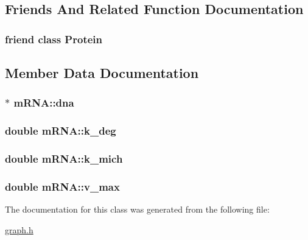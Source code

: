 \subsection{Friends And Related Function Documentation}
\hypertarget{classm_r_n_a_a2cc8b86817f46f61585ecf591984f8eb}{
\subsubsection[{Protein}]{\setlength{\rightskip}{0pt plus 5cm}friend class {\bf Protein}\hspace{0.3cm}{\ttfamily [friend]}}}\label{classm_r_n_a_a2cc8b86817f46f61585ecf591984f8eb}


\subsection{Member Data Documentation}
\hypertarget{classm_r_n_a_ace67bd5431ec023732e05049e5ca9a4b}{
\subsubsection[{dna}]{$\ast$ m\-R\-N\-A\-::dna\hspace{0.3cm}{\ttfamily [private]}}}\label{classm_r_n_a_ace67bd5431ec023732e05049e5ca9a4b}
\hypertarget{classm_r_n_a_ac4e84c4700ca924196809e36fa17c5b7}{
\subsubsection[{k\-\_\-deg}]{\setlength{\rightskip}{0pt plus 5cm}double m\-R\-N\-A\-::k\-\_\-deg\hspace{0.3cm}{\ttfamily [private]}}}\label{classm_r_n_a_ac4e84c4700ca924196809e36fa17c5b7}
\hypertarget{classm_r_n_a_ace3b5460f5ed647cbe52e6a86e8d6ef7}{
\subsubsection[{k\-\_\-mich}]{\setlength{\rightskip}{0pt plus 5cm}double m\-R\-N\-A\-::k\-\_\-mich\hspace{0.3cm}{\ttfamily [private]}}}\label{classm_r_n_a_ace3b5460f5ed647cbe52e6a86e8d6ef7}
\hypertarget{classm_r_n_a_a07cdcbe61a2af4fc74751521e0c7920e}{
\subsubsection[{v\-\_\-max}]{\setlength{\rightskip}{0pt plus 5cm}double m\-R\-N\-A\-::v\-\_\-max\hspace{0.3cm}{\ttfamily [private]}}}\label{classm_r_n_a_a07cdcbe61a2af4fc74751521e0c7920e}


The documentation for this class was generated from the following file\-:\begin{DoxyCompactItemize}
\item 
\hyperlink{graph_8h}{graph.\-h}\end{DoxyCompactItemize}
